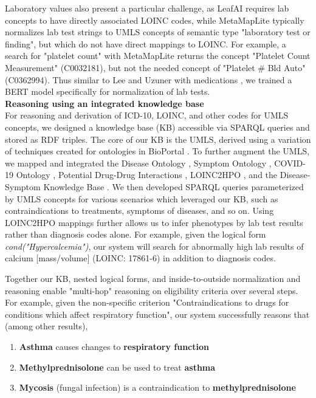 \documentclass[../main.tex]{subfiles}
\begin{document}
Laboratory values also present a particular challenge, as LeafAI requires lab concepts to have directly associated LOINC codes, while MetaMapLite typically normalizes lab test strings to UMLS concepts of semantic type "laboratory test or finding", but which do not have direct mappings to LOINC. For example, a search for "platelet count" with MetaMapLite returns the concept "Platelet Count Measurement" (C0032181), but not the needed concept of "Platelet \# Bld Auto" (C0362994). Thus similar to Lee and Uzuner with medications \cite{lee2020normalizing}, we trained a BERT model specifically for normalization of lab tests. \\

\noindent \textbf{Reasoning using an integrated knowledge base} \\
\noindent For reasoning and derivation of ICD-10, LOINC, and other codes for UMLS concepts, we designed a knowledge base (KB) accessible via SPARQL queries and stored as RDF triples. The core of our KB is the UMLS, derived using a variation of techniques created for ontologies in BioPortal \cite{noy2009bioportal}. To further augment the UMLS, we mapped and integrated the Disease Ontology \cite{schriml2012disease}, Symptom Ontology \cite{sayers2010database}, COVID-19 Ontology \cite{sargsyan2020covid}, Potential Drug-Drug Interactions \cite{ayvaz2015toward}, LOINC2HPO \cite{zhang2019semantic}, and the Disease-Symptom Knowledge Base \cite{wang2008automated}. We then developed SPARQL queries parameterized by UMLS concepts for various scenarios which leveraged our KB, such as contraindications to treatments, symptoms of diseases, and so on. Using LOINC2HPO mappings further allows us to infer phenotypes by lab test results rather than diagnosis codes alone. For example, given the logical form \textit{cond("Hypercalcemia")}, our system will search for abnormally high lab results of calcium [mass/volume] (LOINC: 17861-6) in addition to diagnosis codes.

Together our KB, nested logical forms, and inside-to-outside normalization and reasoning enable "multi-hop" reasoning on eligibility criteria over several steps. For example, given the non-specific criterion "Contraindications to drugs for conditions which affect respiratory function", our system successfully reasons that (among other results),

\begin{enumerate}
    \item \textbf{Asthma} causes changes to \textbf{respiratory function}
    \item \textbf{Methylprednisolone} can be used to treat \textbf{asthma}
    \item \textbf{Mycosis} (fungal infection) is a contraindication to \textbf{methylprednisolone}
\end{enumerate}
\end{document}
